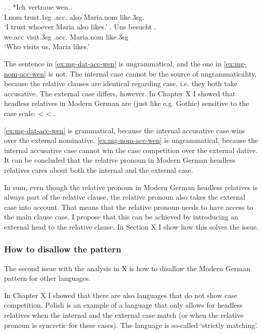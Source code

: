\ex.\label{ex:mg-internal}
\ag. *Ich vertraue wen   . \\
I.\ac{nom} trust.1\ac{sg}\scsub{[dat]} .\ac{acc}. also Maria.\ac{nom} like.3\ac{sg}\scsub{[acc]}.\\
`I trust whoever Maria also likes.' \label{ex:mg-dat-acc-wen}
\bg. Uns besucht   .\\
 we.\ac{acc} visit.3\ac{sg}\scsub{[nom]} .\ac{acc}. Maria.\ac{nom} like.3\ac{sg}\scsub{[acc]}\\
 `Who visits us, Maria likes.' \label{ex:mg-nom-acc-wen-rep}

The sentence in \ref{ex:mg-dat-acc-wen} is ungrammatical, and the one in \ref{ex:mg-nom-acc-wen} is not. The internal case cannot be the source of ungrammaticality, because the relative clauses are identical regarding case, i.e. they both take accusative. The external case differs, however. In Chapter X I showed that headless relatives in Modern German are (just like e.g. Gothic) sensitive to the case scale:  <  < .

\ref{ex:mg-dat-acc-wen} is grammatical, because the internal accusative case wins over the external nominative. \ref{ex:mg-nom-acc-wen} is ungrammatical, because the internal accusative case cannot win the case competition over the external dative. It can be concluded that the relative pronoun in Modern German headless relatives cares about both the internal and the external case.

In sum, even though the relative pronoun in Modern German headless relatives is always part of the relative clause, the relative pronoun also takes the external case into account. That means that the relative pronoun needs to have access to the main clause case. I propose that this can be achieved by introducing an external head to the relative clause. In Section X I show how this solves the issue.


\subsubsection{How to disallow the pattern}

The second issue with the analysis in X is how to disallow the Modern German pattern for other languages.

In Chapter X I showed that there are also languages that do not show case competition. Polish is an example of a language that only allows for headless relatives when the internal and the external case match (or when the relative pronoun is syncretic for these cases). The language is so-called `strictly matching'.


